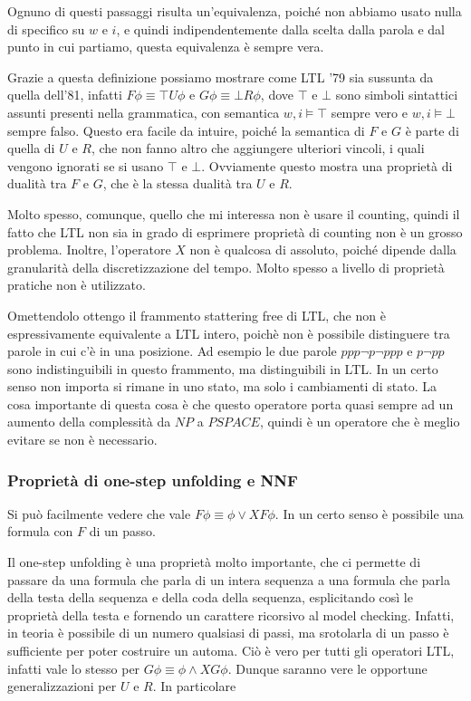 Ognuno di questi passaggi risulta un'equivalenza, poiché non abbiamo usato nulla di specifico su \(w\) e \(i\), e quindi indipendentemente dalla scelta dalla parola e dal punto in cui partiamo, questa equivalenza è sempre vera.

Grazie a questa definizione possiamo mostrare come LTL '79 sia sussunta da quella dell'81, infatti \(F\phi \equiv \top U \phi\) e \(G\phi \equiv \bot R \phi\), dove \(\top\) e \(\bot\) sono simboli sintattici assunti presenti nella grammatica, con semantica \(w,i \models \top\) sempre vero e \(w,i \models \bot\) sempre falso. Questo era facile da intuire, poiché la semantica di \(F\) e \(G\) è parte di quella di \(U\) e \(R\), che non fanno altro che aggiungere ulteriori vincoli, i quali vengono ignorati se si usano \(\top\) e \(\bot\). Ovviamente questo mostra una proprietà di dualità tra \(F\) e \(G\), che è la stessa dualità tra \(U\) e \(R\).

Molto spesso, comunque, quello che mi interessa non è usare il counting, quindi il fatto che LTL non sia in grado di esprimere proprietà di counting non è un grosso problema. Inoltre, l'operatore \(X\) non è qualcosa di assoluto, poiché dipende dalla granularità della discretizzazione del tempo. Molto spesso a livello di proprietà pratiche non è utilizzato.

Omettendolo ottengo il frammento stattering free di LTL, che non è espressivamente equivalente a LTL intero, poichè non è possibile distinguere tra parole in cui c'è  in una posizione. Ad esempio le due parole \(ppp\neg p \neg p pp\) e \(p\neg p p\) sono indistinguibili in questo frammento, ma distinguibili in LTL\@. In un certo senso non importa  si rimane in uno stato, ma solo i cambiamenti di stato. La cosa importante di questa cosa è che questo operatore porta quasi sempre ad un aumento della complessità da \(NP\) a \(PSPACE\), quindi è un operatore che è meglio evitare se non è necessario.

\subsubsection{Proprietà di one-step unfolding e NNF}
Si può facilmente vedere che vale \(F\phi\equiv \phi \lor X F \phi\). In un certo senso è possibile  una formula con \(F\) di un passo.

Il one-step unfolding è una proprietà molto importante, che ci permette di passare da una formula che parla di un intera sequenza a una formula che parla della testa della sequenza e della coda della sequenza, esplicitando così le proprietà della testa e fornendo un carattere ricorsivo al model checking. Infatti, in teoria è possibile  di un numero qualsiasi di passi, ma srotolarla di un passo è sufficiente per poter costruire un automa. Ciò è vero per tutti gli operatori LTL, infatti vale lo stesso per \(G\phi\equiv\phi\land XG\phi\). Dunque saranno vere le opportune generalizzazioni per \(U\) e \(R\). In particolare

